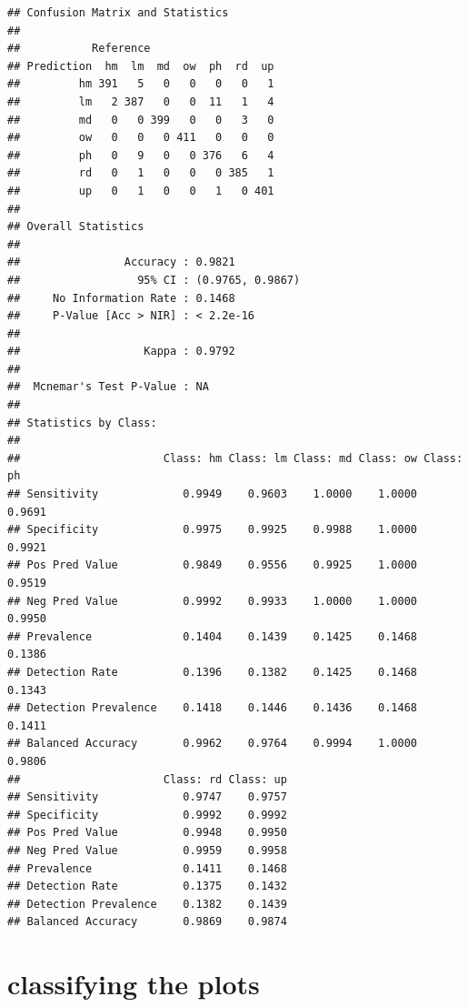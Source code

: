 \documentclass[
]{article}
\newenvironment{Shaded}{\begin{snugshade}}{\end{snugshade}}
\newcommand{\CommentTok}[1]{\textcolor[rgb]{0.56,0.35,0.01}{\textit{#1}}}
\newcommand{\FunctionTok}[1]{\textcolor[rgb]{0.13,0.29,0.53}{\textbf{#1}}}
\newcommand{\NormalTok}[1]{#1}
\newcommand{\SpecialCharTok}[1]{\textcolor[rgb]{0.81,0.36,0.00}{\textbf{#1}}}
\begin{document}
\begin{Shaded}
\end{Shaded}

\begin{verbatim}
## Confusion Matrix and Statistics
## 
##           Reference
## Prediction  hm  lm  md  ow  ph  rd  up
##         hm 391   5   0   0   0   0   1
##         lm   2 387   0   0  11   1   4
##         md   0   0 399   0   0   3   0
##         ow   0   0   0 411   0   0   0
##         ph   0   9   0   0 376   6   4
##         rd   0   1   0   0   0 385   1
##         up   0   1   0   0   1   0 401
## 
## Overall Statistics
##                                           
##                Accuracy : 0.9821          
##                  95% CI : (0.9765, 0.9867)
##     No Information Rate : 0.1468          
##     P-Value [Acc > NIR] : < 2.2e-16       
##                                           
##                   Kappa : 0.9792          
##                                           
##  Mcnemar's Test P-Value : NA              
## 
## Statistics by Class:
## 
##                      Class: hm Class: lm Class: md Class: ow Class: ph
## Sensitivity             0.9949    0.9603    1.0000    1.0000    0.9691
## Specificity             0.9975    0.9925    0.9988    1.0000    0.9921
## Pos Pred Value          0.9849    0.9556    0.9925    1.0000    0.9519
## Neg Pred Value          0.9992    0.9933    1.0000    1.0000    0.9950
## Prevalence              0.1404    0.1439    0.1425    0.1468    0.1386
## Detection Rate          0.1396    0.1382    0.1425    0.1468    0.1343
## Detection Prevalence    0.1418    0.1446    0.1436    0.1468    0.1411
## Balanced Accuracy       0.9962    0.9764    0.9994    1.0000    0.9806
##                      Class: rd Class: up
## Sensitivity             0.9747    0.9757
## Specificity             0.9992    0.9992
## Pos Pred Value          0.9948    0.9950
## Neg Pred Value          0.9959    0.9958
## Prevalence              0.1411    0.1468
## Detection Rate          0.1375    0.1432
## Detection Prevalence    0.1382    0.1439
## Balanced Accuracy       0.9869    0.9874
\end{verbatim}

\section{classifying the plots}\label{classifying-the-plots-2}
\end{document}
